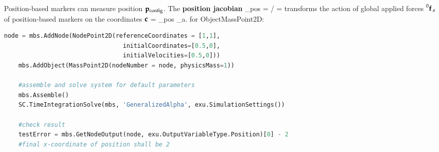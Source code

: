     Position-based markers can measure position $\mathbf{p}_\mathrm{config}$. The {\bf position jacobian}  
    \be
      \Jm_{pos} = \partial \pv\cCur / \partial \cv\cCur = 
    \ee
    transforms the action of global applied forces $\prescript{0}{}{\mathbf{f}}\,_a$ of position-based markers on the coordinates $\mathbf{c}$
    \be
      \Qm = \Jm_{pos} _a.
    \ee
{} for ObjectMassPoint2D:
\pythonstyle
\begin{lstlisting}[language=Python, firstnumber=1]
    node = mbs.AddNode(NodePoint2D(referenceCoordinates = [1,1], 
                                 initialCoordinates=[0.5,0],
                                 initialVelocities=[0.5,0]))
    mbs.AddObject(MassPoint2D(nodeNumber = node, physicsMass=1))

    #assemble and solve system for default parameters
    mbs.Assemble()
    SC.TimeIntegrationSolve(mbs, 'GeneralizedAlpha', exu.SimulationSettings())

    #check result
    testError = mbs.GetNodeOutput(node, exu.OutputVariableType.Position)[0] - 2 
    #final x-coordinate of position shall be 2

\end{lstlisting}

\newpage

